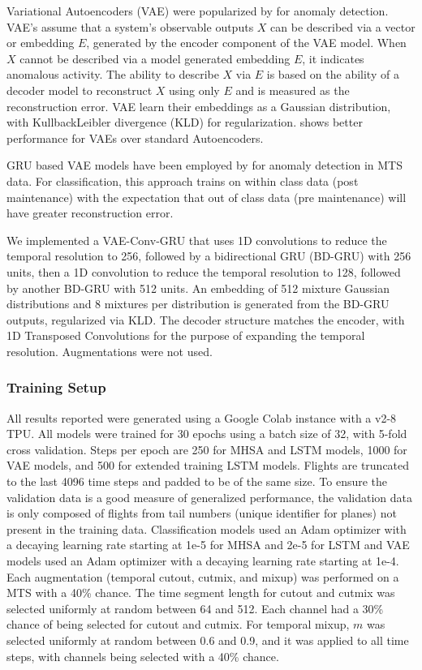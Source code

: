 \documentclass[letterpaper]{article} %
\begin{document}
Variational Autoencoders (VAE) were popularized by \cite{an2015variational} for anomaly detection. VAE's assume that a system's observable outputs \(X\) can be described via a vector or embedding \(E\), generated by the encoder component of the VAE model. When \(X\) cannot be described via a model generated embedding \(E\), it indicates anomalous activity. The ability to describe \(X\) via \(E\) is based on the ability of a decoder model to reconstruct \(X\) using only \(E\) and is measured as the reconstruction error. VAE learn their embeddings as a Gaussian distribution, with KullbackLeibler divergence (KLD) for regularization. \cite{an2015variational} shows better performance for VAEs over standard Autoencoders.

GRU based VAE models have been employed by \cite{guo2018multidimensional} for anomaly detection in MTS data. For classification, this approach trains on within class data (post maintenance) with the expectation that out of class data (pre maintenance) will have greater reconstruction error.

We implemented a VAE-Conv-GRU that uses 1D convolutions to reduce the temporal resolution to 256, followed by a bidirectional GRU (BD-GRU) with 256 units, then a 1D convolution to reduce the temporal resolution to 128, followed by another BD-GRU with 512 units. An embedding of 512 mixture Gaussian distributions and 8 mixtures per distribution is generated from the BD-GRU outputs, regularized via KLD. The decoder structure matches the encoder, with 1D Transposed Convolutions for the purpose of expanding the temporal resolution. Augmentations were not used.

\subsubsection{Training Setup}

All results reported were generated using a Google Colab instance with a v2-8 TPU. All models were trained for 30 epochs using a batch size of 32, with 5-fold cross validation. Steps per epoch are 250 for MHSA and LSTM models, 1000 for VAE models, and 500 for extended training LSTM models.  Flights are truncated to the last 4096 time steps and padded to be of the same size. To ensure the validation data is a good measure of generalized performance, the validation data is only composed of flights from tail numbers (unique identifier for planes) not present in the training data. Classification models used an Adam optimizer with a decaying learning rate starting at 1e-5 for MHSA and 2e-5 for LSTM and VAE models used an Adam optimizer with a decaying learning rate starting at 1e-4. Each augmentation (temporal cutout, cutmix, and mixup) was performed on a MTS with a 40\% chance. The time segment length for cutout and cutmix was selected uniformly at random between 64 and 512. Each channel had a 30\% chance of being selected for cutout and cutmix. For temporal mixup, $m$ was selected uniformly at random between 0.6 and 0.9, and it was applied to all time steps, with channels being selected with a 40\% chance.
\end{document}
